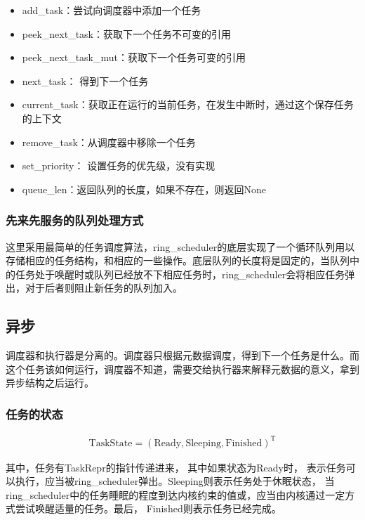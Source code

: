 \begin{itemize}
\item add\_task：尝试向调度器中添加一个任务
\item peek\_next\_task：获取下一个任务不可变的引用
\item peek\_next\_task\_mut：获取下一个任务可变的引用
\item next\_task： 得到下一个任务
\item current\_task：获取正在运行的当前任务，在发生中断时，通过这个保存任务的上下文
\item remove\_task：从调度器中移除一个任务
\item set\_priority： 设置任务的优先级，没有实现
\item queue\_len：返回队列的长度，如果不存在，则返回None
\end{itemize}


\subsubsection{先来先服务的队列处理方式}

这里采用最简单的任务调度算法，ring\_scheduler的底层实现了一个循环队列用以存储相应的任务结构，和相应的一些操作。底层队列的长度将是固定的，当队列中的任务处于唤醒时或队列已经放不下相应任务时，ring\_scheduler会将相应任务弹出，对于后者则阻止新任务的队列加入。

\subsection{异步}

调度器和执行器是分离的。调度器只根据元数据调度，得到下一个任务是什么。而这个任务该如何运行，调度器不知道，需要交给执行器来解释元数据的意义，拿到异步结构之后运行。

\subsubsection{任务的状态}

\begin{equation}
    \label{equation:c3taskstate}
    \begin{aligned}
\boldsymbol{\mathrm{TaskState}} = (\mathrm{Ready}, \mathrm{Sleeping}, \mathrm{Finished})^{\mathrm{T}}
    \end{aligned}
\end{equation}

其中，任务有TaskRepr的指针传递进来， 其中如果状态为Ready时， 表示任务可以执行，应当被ring\_scheduler弹出。Sleeping则表示任务处于休眠状态， 当ring\_scheduler中的任务睡眠的程度到达内核约束的值或，应当由内核通过一定方式尝试唤醒适量的任务。最后， Finished则表示任务已经完成。

